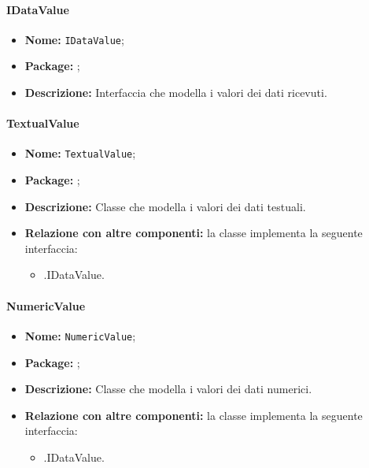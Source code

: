 \paragraph{IDataValue}
\begin{itemize}
\item \textbf{Nome:} \texttt{IDataValue};
\item \textbf{Package:} \texttt{\smodel{}};
\item \textbf{Descrizione:} Interfaccia che modella i valori dei dati ricevuti.
\end{itemize}

\paragraph{TextualValue}
\begin{itemize}
\item \textbf{Nome:} \texttt{TextualValue};
\item \textbf{Package:} \texttt{\smodel{}};
\item \textbf{Descrizione:} Classe che modella i valori dei dati testuali.
\item \textbf{Relazione con altre componenti:} la classe implementa la seguente interfaccia:
		\begin{itemize}
			\item \smodel{}.IDataValue.
		\end{itemize}
\end{itemize}

\paragraph{NumericValue}
\begin{itemize}
\item \textbf{Nome:} \texttt{NumericValue};
\item \textbf{Package:} \texttt{\smodel{}};
\item \textbf{Descrizione:} Classe che modella i valori dei dati numerici.
\item \textbf{Relazione con altre componenti:} la classe implementa la seguente interfaccia:
		\begin{itemize}
			\item \smodel{}.IDataValue.
		\end{itemize}
\end{itemize}

